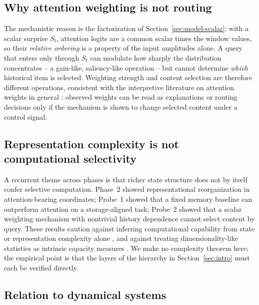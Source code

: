 \subsection{Why attention weighting is not routing}\label{sec:disc-why}

The mechanistic reason is the factorization of Section~\ref{sec:model-scalar}:
with a scalar surprise $S_t$, attention logits are a common scalar times
the window values, so their \emph{relative ordering} is a property of the
input amplitudes alone.  A query that enters only through $S_t$ can
modulate how sharply the distribution concentrates -- a gain-like,
saliency-like operation -- but cannot determine \emph{which} historical
item is selected.  Weighting strength and content selection are
therefore different operations, consistent with the interpretive
literature on attention weights in general \citep{jainwallace2019,
serranosmith2019,wiegreffe2019}: observed weights can be read as
explanations or routing decisions only if the mechanism is shown to
change selected content under a control signal.

\subsection{Representation complexity is not computational selectivity}
\label{sec:disc-complexity}

A recurrent theme across phases is that richer state structure does not
by itself confer selective computation.  Phase~2 showed representational
reorganization in attention-bearing coordinates; Probe~1 showed that a
fixed memory baseline can outperform attention on a storage-aligned
task; Probe~2 showed that a scalar weighting mechanism with nontrivial
history dependence cannot select content by query.  These results
caution against inferring computational capability from state or
representation complexity alone \citep{chungabbott2021,gaoganguli2015},
and against treating dimensionality-like statistics as intrinsic
capacity measures \citep{facco2017}.  We make no complexity theorem here;
the empirical point is that the layers of the hierarchy in
Section~\ref{sec:intro} must each be verified directly.

\subsection{Relation to dynamical systems}\label{sec:disc-dyn}

